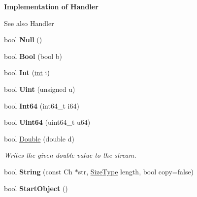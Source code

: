\begin{Indent}{\bf Implementation of Handler}\par
{\em \begin{DoxySeeAlso}{See also}
Handler 
\end{DoxySeeAlso}
}\begin{DoxyCompactItemize}
\item 
\hypertarget{class_writer_a7d80ac367783ac4eb8b0118924b377bd}{}bool {\bfseries Null} ()\label{class_writer_a7d80ac367783ac4eb8b0118924b377bd}

\item 
\hypertarget{class_writer_adf126d95f0aec7c2f7667df048227929}{}bool {\bfseries Bool} (bool b)\label{class_writer_adf126d95f0aec7c2f7667df048227929}

\item 
\hypertarget{class_writer_ae006cfa073c369c57797bc842b817ba4}{}bool {\bfseries Int} (\hyperlink{_s_d_l__thread_8h_a6a64f9be4433e4de6e2f2f548cf3c08e}{int} i)\label{class_writer_ae006cfa073c369c57797bc842b817ba4}

\item 
\hypertarget{class_writer_a20c4edc79c0d5a9402e1deb8f09feadf}{}bool {\bfseries Uint} (unsigned u)\label{class_writer_a20c4edc79c0d5a9402e1deb8f09feadf}

\item 
\hypertarget{class_writer_aa63032bf3dce66f817267cc451922a6e}{}bool {\bfseries Int64} (int64\+\_\+t i64)\label{class_writer_aa63032bf3dce66f817267cc451922a6e}

\item 
\hypertarget{class_writer_a71b2ee12ae85d181eb9abdb686565615}{}bool {\bfseries Uint64} (uint64\+\_\+t u64)\label{class_writer_a71b2ee12ae85d181eb9abdb686565615}

\item 
bool \hyperlink{class_writer_ae80dc830a4f1d84e6eaf6b182c0ceccb}{Double} (double d)
\begin{DoxyCompactList}\small\item\em Writes the given {\ttfamily double} value to the stream. \end{DoxyCompactList}\item 
\hypertarget{class_writer_ac317eb622ea116293d99e3edffe6f1c3}{}bool {\bfseries String} (const Ch $\ast$str, \hyperlink{rapidjson_8h_a5ed6e6e67250fadbd041127e6386dcb5}{Size\+Type} length, bool copy=false)\label{class_writer_ac317eb622ea116293d99e3edffe6f1c3}

\item 
\hypertarget{class_writer_a393fe59329dfd8110016183090b02d57}{}bool {\bfseries Start\+Object} ()\label{class_writer_a393fe59329dfd8110016183090b02d57}


\end{DoxyCompactItemize}
\end{Indent}
